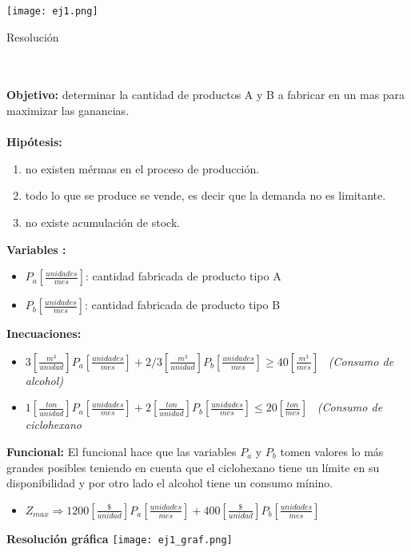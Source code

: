 \documentclass[12pt]{book}
\begin{document}
\texttt{[image: ej1.png]}
\linebreak
\linebreak
\\
\begin{large}
Resoluci\'on
\end{large}
\\
\\
\textbf{Objetivo: }determinar la cantidad de productos A y B a fabricar en un mas para maximizar las ganancias.
\\
\\
\textbf{Hip\'otesis: }
\begin{enumerate}
\item no existen m\'ermas en el proceso de producci\'on.
\item todo lo que se produce se vende, es decir que la demanda no es limitante.
\item no existe acumulaci\'on de stock.
\end{enumerate}
\textbf{Variables :}
\begin{itemize}
\item $P_a [\frac{unidades}{mes}]$: cantidad fabricada de producto tipo A
\item $P_b [\frac{unidades}{mes}]$: cantidad fabricada de producto tipo B 
\end{itemize}
\textbf{Inecuaciones: }
\begin{itemize}
\item $3 [\frac{m^3}{unidad}]  P_a[\frac{unidades}{mes}] + 2/3 [\frac{m^3}{unidad}]  P_b [\frac{unidades}{mes}] \geq 40 [\frac{m^3}{mes}]  $ \, \textit{(Consumo de alcohol)}

\item $1 [\frac{ton}{unidad}]  P_a[\frac{unidades}{mes}] + 2 [\frac{ton}{unidad}]  P_b [\frac{unidades}{mes}] \leq 20 [\frac{ton}{mes}]  $ \, \textit{ (Consumo de ciclohexano}
\end{itemize}
\pagebreak
\textbf{Funcional: }El funcional hace que las variables $P_a$ y $P_b$ tomen valores lo m\'as grandes posibles teniendo en cuenta que el ciclohexano tiene un l\'imite en su disponibilidad y por otro lado el alcohol tiene un consumo m\'inino.
\begin{itemize}
\item $Z_{max} \Rightarrow 1200 [\frac{\$}{unidad}]  P_a[\frac{unidades}{mes}] + 400 [\frac{\$}{unidad}]  P_b [\frac{unidades}{mes}] $
\end{itemize}

\begin{center}
\textbf{Resoluci\'on gr\'afica}
\texttt{[image: ej1\_graf.png]}
\end{center}
\end{document}
